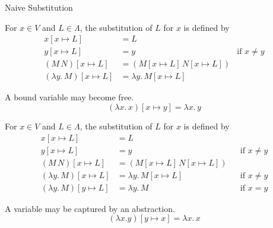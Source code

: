 \begin{frame}[allowframebreaks]{Naive Substitution}
  \begin{definition}
    For $x \in V$ and $L \in \Lambda$, the substitution of $L$ for $x$ is
    defined by
    \begin{align*}
      x[x \mapsto L] & = L \\
      y[x \mapsto L] & = y & \text{if $x \neq y$} \\
      (M\,N)[x \mapsto L] & = (M[x \mapsto L]\,N[x \mapsto L]) \\
      (\lambda y.\, M)[x \mapsto L] & = \lambda y.\, M[x \mapsto L] 
    \end{align*}
  \end{definition}
    A bound variable may become free. 
    \[
      (\lambda x.\, x)[x \mapsto y] = \lambda x.\, y
    \]
  \begin{definition}
    For $x \in V$ and $L \in \Lambda$, the substitution
    of $L$ for $x$ is defined by
    \begin{align*}
      x[x \mapsto L] & = L \\
      y[x \mapsto L] & = y && \text{if $x \neq y$} \\
      (M\,N)[x \mapsto L] & = (M[x \mapsto L]\,N[x \mapsto L]) \\
      (\lambda y.\, M)[x \mapsto L] & = \lambda y.\, M[x \mapsto L] 
                                    && \text{if $x \neq y$} \\
      (\lambda y.\, M)[y \mapsto L] & = \lambda y.\, M
                                    && \text{if $x = y$} 
    \end{align*}
  \end{definition}
    A variable may be captured by an abstraction. 
    \[
      (\lambda x. y)[y \mapsto x] = \lambda x.\, x
    \]
\end{frame}

